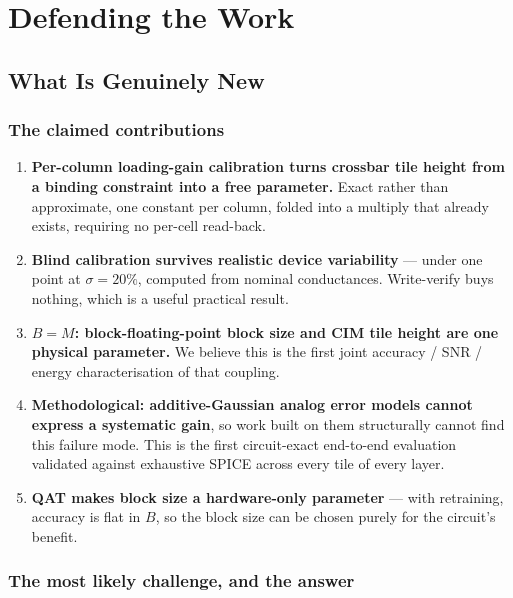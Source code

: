 \documentclass[11pt,a4paper]{report}
\begin{document}
\part{Defending the Work}
\chapter{What Is Genuinely New}

\section{The claimed contributions}

\begin{enumerate}[leftmargin=1.6em]
  \item \textbf{Per-column loading-gain calibration turns crossbar tile height
        from a binding constraint into a free parameter.} Exact rather than
        approximate, one constant per column, folded into a multiply that
        already exists, requiring no per-cell read-back.
  \item \textbf{Blind calibration survives realistic device variability} ---
        under one point at $\sigma = 20\%$, computed from nominal
        conductances. Write-verify buys nothing, which is a useful practical
        result.
  \item \textbf{$B = M$: block-floating-point block size and CIM tile height
        are one physical parameter.} We believe this is the first joint
        accuracy / SNR / energy characterisation of that coupling.
  \item \textbf{Methodological: additive-Gaussian analog error models cannot
        express a systematic gain}, so work built on them structurally cannot
        find this failure mode. This is the first circuit-exact end-to-end
        evaluation validated against exhaustive SPICE across every tile of
        every layer.
  \item \textbf{QAT makes block size a hardware-only parameter} --- with
        retraining, accuracy is flat in $B$, so the block size can be chosen
        purely for the circuit's benefit.
\end{enumerate}

\section{The most likely challenge, and the answer}
\end{document}
